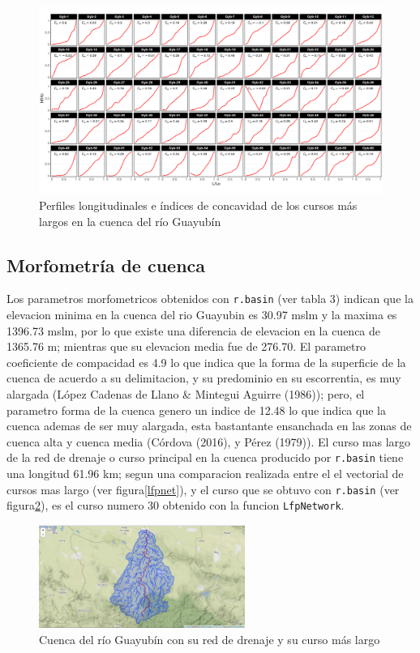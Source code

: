 \documentclass[11pt,]{article}
\begin{document}
\begin{figure}
\centering
\includegraphics[width=1.00000\textwidth]{Indices de concavidad.png}
\caption{Perfiles longitudinales e índices de concavidad de los cursos
más largos en la cuenca del río Guayubín\label{indicec}}
\end{figure}

\subsection{Morfometría de cuenca}\label{morfometruxeda-de-cuenca}

Los parametros morfometricos obtenidos con \texttt{r.basin} (ver tabla
3) indican que la elevacion minima en la cuenca del rio Guayubin es
30.97 mslm y la maxima es 1396.73 mslm, por lo que existe una diferencia
de elevacion en la cuenca de 1365.76 m; mientras que su elevacion media
fue de 276.70. El parametro coeficiente de compacidad es 4.9 lo que
indica que la forma de la superficie de la cuenca de acuerdo a su
delimitacion, y su predominio en su escorrentia, es muy alargada (López
Cadenas de Llano \& Mintegui Aguirre (1986)); pero, el parametro forma
de la cuenca genero un indice de 12.48 lo que indica que la cuenca
ademas de ser muy alargada, esta bastantante ensanchada en las zonas de
cuenca alta y cuenca media (Córdova (2016), y Pérez (1979)). El curso
mas largo de la red de drenaje o curso principal en la cuenca producido
por \texttt{r.basin} tiene una longitud 61.96 km; segun una comparacion
realizada entre el el vectorial de cursos mas largo (ver
figura\ref{lfpnet}), y el curso que se obtuvo con \texttt{r.basin} (ver
figura\ref{vectoresrbasin}), es el curso numero 30 obtenido con la
funcion \texttt{LfpNetwork}.

\begin{figure}
\centering
\includegraphics[width=0.60000\textwidth]{cuenca-red de drenaje-curso mas largo.png}
\caption{Cuenca del río Guayubín con su red de drenaje y su curso más
largo\label{vectoresrbasin}}
\end{figure}
\end{document}
